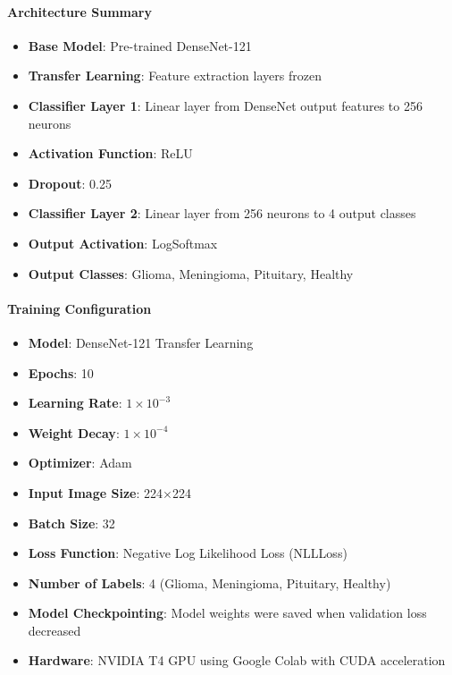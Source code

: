 \documentclass[conference]{IEEEtran}
\begin{document}
\paragraph{Architecture Summary}
\begin{itemize}
    \item \textbf{Base Model}: Pre-trained DenseNet-121
    \item \textbf{Transfer Learning}: Feature extraction layers frozen
    \item \textbf{Classifier Layer 1}: Linear layer from DenseNet output features to 256 neurons
    \item \textbf{Activation Function}: ReLU
    \item \textbf{Dropout}: 0.25
    \item \textbf{Classifier Layer 2}: Linear layer from 256 neurons to 4 output classes
    \item \textbf{Output Activation}: LogSoftmax
    \item \textbf{Output Classes}: Glioma, Meningioma, Pituitary, Healthy
\end{itemize}
\vspace{0.5cm}
\paragraph{Training Configuration}
\begin{itemize}
    \item \textbf{Model}: DenseNet-121 Transfer Learning
    
    \item \textbf{Epochs}: 10

    \item \textbf{Learning Rate}: $1 \times 10^{-3}$

    \item \textbf{Weight Decay}: $1 \times 10^{-4}$
    
    \item \textbf{Optimizer}: Adam
    
    \item \textbf{Input Image Size}: 224$\times$224
    
    \item \textbf{Batch Size}: 32
    
    \item \textbf{Loss Function}: Negative Log Likelihood Loss (NLLLoss)

    \item \textbf{Number of Labels}: 4 (Glioma, Meningioma, Pituitary, Healthy)
    
    \item \textbf{Model Checkpointing}: Model weights were saved when validation loss decreased
    
    \item \textbf{Hardware}: NVIDIA T4 GPU using Google Colab with CUDA acceleration
\end{itemize}
\end{document}
